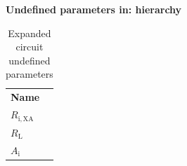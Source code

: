 {\textbf{Undefined parameters in: hierarchy}}

\begin{table}[h]
\centering
\begin{tabular}[c]{l}
\textbf{Name} \\ 
\rowcolor{myyellow}
$R_{\mathrm{i},\mathrm{XA}}$ \\ 
$R_{\mathrm{L}}$ \\ 
\rowcolor{myyellow}
$A_{\mathrm{i}}$ \\ 
\end{tabular}
\caption{Expanded circuit undefined parameters}
\end{table}

